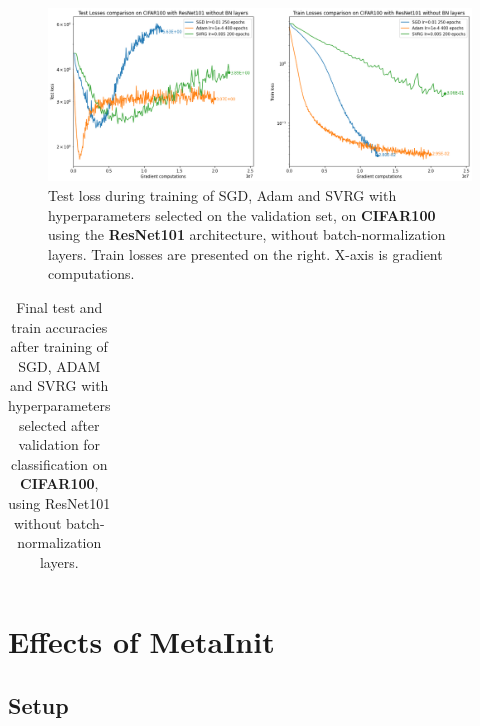 \documentclass[a4paper,11pt,oneside]{report}
\begin{document}
\begin{figure}
    \centering
    \includegraphics[width=\columnwidth]{report/figures/CIFAR100noBN.png}
    \caption{Test loss during training of SGD, Adam and SVRG with hyperparameters selected on the validation set, on \textbf{CIFAR100} using the \textbf{ResNet101} architecture, without batch-normalization layers. Train losses are presented on the right. X-axis is gradient computations.}
    \label{fig:ResNet101noBNresults}
\end{figure}


\begin{table}[h]
    \begin{center}
        \begin{tabular}{||c | c | c||}
             \hline
             
        \end{tabular}
    \end{center}
    \caption{Final test and train accuracies after training of SGD, ADAM and SVRG with hyperparameters selected after validation for classification on \textbf{CIFAR100}, using ResNet101 without batch-normalization layers.}
    \label{tab:CIFAR100noBNacc}
\end{table}

\section{Effects of MetaInit}
\subsection{Setup}
\end{document}
